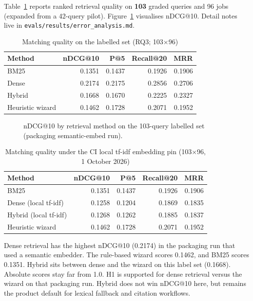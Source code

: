 Table~\ref{tab:rq3} reports ranked retrieval quality on \textbf{103} graded queries and 96 jobs (expanded from a 42-query pilot). Figure~\ref{fig:rq3-bars} visualises nDCG@10. Detail notes live in \texttt{evals/results/error\_analysis.md}.

\begin{table}[ht]
\centering
\small
\caption{Matching quality on the labelled set (RQ3; 103$\times$96)}
\label{tab:rq3}
\begin{tabular}{@{}lrrrr@{}}
\toprule
\textbf{Method} & \textbf{nDCG@10} & \textbf{P@5} & \textbf{Recall@20} & \textbf{MRR} \\
\midrule
BM25 & 0.1351 & 0.1437 & 0.1926 & 0.1906 \\
Dense & 0.2174 & 0.2175 & 0.2856 & 0.2706 \\
Hybrid & 0.1668 & 0.1670 & 0.2225 & 0.2327 \\
Heuristic wizard & 0.1462 & 0.1728 & 0.2071 & 0.1952 \\
\bottomrule
\end{tabular}
\end{table}

\begin{figure}[ht]
\centering
{}
\caption{nDCG@10 by retrieval method on the 103-query labelled set (packaging semantic-embed run).}
\label{fig:rq3-bars}
\end{figure}

\begin{table}[ht]
\centering
\small
\caption{Matching quality under the CI local tf-idf embedding pin (103$\times$96, 1 October 2026)}
\label{tab:rq3-ci}
\begin{tabular}{@{}lrrrr@{}}
\toprule
\textbf{Method} & \textbf{nDCG@10} & \textbf{P@5} & \textbf{Recall@20} & \textbf{MRR} \\
\midrule
BM25 & 0.1351 & 0.1437 & 0.1926 & 0.1906 \\
Dense (local tf-idf) & 0.1258 & 0.1204 & 0.1869 & 0.1835 \\
Hybrid (local tf-idf) & 0.1268 & 0.1262 & 0.1885 & 0.1837 \\
Heuristic wizard & 0.1462 & 0.1728 & 0.2071 & 0.1952 \\
\bottomrule
\end{tabular}
\end{table}

Dense retrieval has the highest nDCG@10 (0.2174) in the packaging run that used a semantic embedder. The rule-based wizard scores 0.1462, and BM25 scores 0.1351. Hybrid sits between dense and the wizard on this label set (0.1668). Absolute scores stay far from 1.0. H1 is supported for dense retrieval versus the wizard on that packaging run. Hybrid does not win nDCG@10 here, but remains the product default for lexical fallback and citation workflows.

